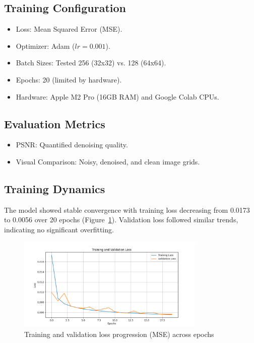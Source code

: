 \documentclass[final]{article}
\begin{document}
\subsection{Training Configuration}
\begin{itemize}
    \item Loss: Mean Squared Error (MSE).
    \item Optimizer: Adam ($lr = 0.001$).
    \item Batch Sizes: Tested 256 (32x32) vs. 128 (64x64).
    \item Epochs: 20 (limited by hardware).
    \item Hardware: Apple M2 Pro (16GB RAM) and Google Colab CPUs.
\end{itemize}

\subsection{Evaluation Metrics}
\begin{itemize}
    \item PSNR: Quantified denoising quality.
    \item Visual Comparison: Noisy, denoised, and clean image grids.
\end{itemize}

\subsection{Training Dynamics}
The model showed stable convergence with training loss decreasing from 0.0173 to 0.0056 over 20 epochs (Figure~\ref{fig:loss}). Validation loss followed similar trends, indicating no significant overfitting.

\begin{figure}[htbp]
\centering
\includegraphics[width=0.8\textwidth]{loss_curve.png}
\caption{Training and validation loss progression (MSE) across epochs}
\label{fig:loss}
\end{figure}
\end{document}
